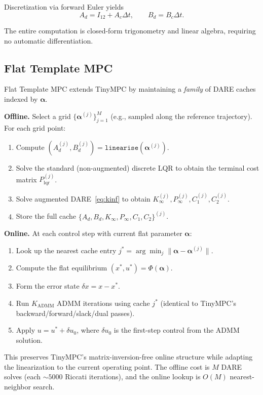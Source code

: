 \documentclass[letterpaper, 10pt, conference]{IEEEtran}
\newcommand{\balpha}{\bm{\alpha}}
\begin{document}
Discretization via forward Euler yields
\begin{equation}\label{eq:disc}
  A_d = I_{12} + A_c \Delta t, \qquad
  B_d = B_c \Delta t.
\end{equation}

The entire computation is closed-form trigonometry and linear algebra,
requiring no automatic differentiation.

\subsection{Flat Template MPC}\label{sec:flat_template}

Flat Template MPC extends TinyMPC by maintaining a \emph{family}
of DARE caches indexed by $\balpha$.

\textbf{Offline.}
Select a grid $\{\balpha^{(j)}\}_{j=1}^M$
(e.g., sampled along the reference trajectory).
For each grid point:
\begin{enumerate}
  \item Compute $(A_d^{(j)}, B_d^{(j)}) = \texttt{linearise}(\balpha^{(j)})$.
  \item Solve the standard (non-augmented) discrete LQR
    to obtain the terminal cost matrix $P_{\mathrm{lqr}}^{(j)}$.
  \item Solve augmented DARE~\eqref{eq:kinf} to obtain
    $K_\infty^{(j)}, P_\infty^{(j)}, C_1^{(j)}, C_2^{(j)}$.
  \item Store the full cache
    $\{A_d, B_d, K_\infty, P_\infty, C_1, C_2\}^{(j)}$.
\end{enumerate}

\textbf{Online.}
At each control step with current flat parameter $\balpha$:
\begin{enumerate}
  \item Look up the nearest cache entry
    $j^* = \arg\min_j \|\balpha - \balpha^{(j)}\|$.
  \item Compute the flat equilibrium
    $(x^*, u^*) = \Phi(\balpha)$.
  \item Form the error state $\delta x = x - x^*$.
  \item Run $K_{\mathrm{ADMM}}$ ADMM iterations using cache $j^*$
    (identical to TinyMPC's backward/forward/slack/dual passes).
  \item Apply $u = u^* + \delta u_0$, where $\delta u_0$ is
    the first-step control from the ADMM solution.
\end{enumerate}

This preserves TinyMPC's matrix-inversion-free online structure
while adapting the linearization to the current operating point.
The offline cost is $M$ DARE solves (each ${\sim}5000$ Riccati
iterations), and the online lookup is $O(M)$ nearest-neighbor search.
\end{document}

